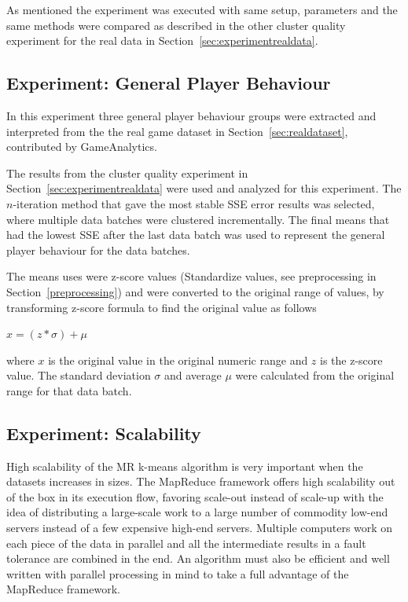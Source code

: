 As mentioned the experiment was executed with same setup, parameters and the same methods were compared as described in the other cluster quality experiment for the real data in Section~\ref{sec:experimentrealdata}.

\subsection{Experiment: General Player Behaviour}
\label{sec:experiment_gpb}
In this experiment three general player behaviour groups were extracted and interpreted from the the real game dataset in Section~\ref{sec:realdataset}, contributed by GameAnalytics. 

The results from the cluster quality experiment in Section~\ref{sec:experimentrealdata} were used and analyzed for this experiment. The $n$-iteration method that gave the most stable SSE error results was selected, where multiple data batches were clustered incrementally. The final means that had the lowest SSE after the last data batch was used to represent the general player behaviour for the data batches. 

The means uses were z-score values (Standardize values, see preprocessing in Section~\ref{preprocessing}) and were converted to the original range of values, by transforming z-score formula to find the original value as follows

\begin{center}
$x = (z * \sigma) + \mu$ 
\end{center}

where $x$ is the original value in the original numeric range and $z$ is the z-score value. The standard deviation $\sigma$ and average $\mu$ were calculated from the original range for that data batch.

\subsection{Experiment: Scalability}
\label{sec:experimentscalability}
High scalability of the MR k-means algorithm is very important when the datasets increases in sizes. The MapReduce framework offers high scalability out of the box in its execution flow, favoring scale-out instead of scale-up with the idea of distributing a large-scale work to a large number of commodity low-end servers instead of a few expensive high-end servers. Multiple computers work on each piece of the data in parallel and all the intermediate results in a fault tolerance are combined in the end. An algorithm must also be efficient and well written with parallel processing in mind to take a full advantage of the MapReduce framework.

